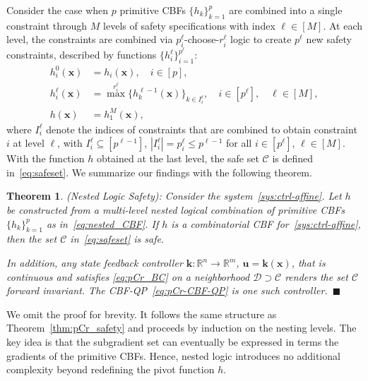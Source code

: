\documentclass[journal,twoside,web]{ieeecolor}
\newcommand{\real}{\mathbb{R}}
\newcommand{\until}[1]{[#1]}
\newcommand{\map}[3]{#1:#2 \rightarrow #3}
\newcommand{\longthmtitle}[1]{\mbox{}{\textit{(#1):}}}
\newcommand{\Cc}{\mathcal{C}}
\newcommand{\Dc}{\mathcal{D}}
\newtheorem{theorem}{Theorem}
\theoremstyle{definition}
\newcommand{\bk}{\mathbf{k}}
\newcommand{\bu}{\mathbf{u}}
\newcommand{\bx}{\mathbf{x}}
\begin{document}
Consider the case when $p$ primitive CBFs $\{h_k\}_{k=1}^p$ are combined into a single constraint through $M$ levels of safety specifications with index ${\ell \in \until{M}}$.
At each level, the constraints are combined via $p_i^\ell$-choose-$r_i^\ell$ logic to create $p^\ell$ new safety constraints, described by functions $\{h_i^\ell\}_{i=1}^{p^\ell}$:
\begin{equation}\label{eq:nested_CBF}
\begin{aligned}
    h_i^0(\bx) & = h_i(\bx),
    \quad i \in \until{p}, \\
    h_i^\ell(\bx) & =
    \max^{r_i^\ell} \{h_k^{\ell-1}(\bx)\}_{k \in I_i^\ell},
    \quad i \in \until{p^\ell}, \quad \ell \in \until{M}, \\
    h(\bx) & = h_1^M(\bx),
\end{aligned}
\end{equation}
where $I_i^\ell$ denote the indices of constraints that are combined to obtain constraint $i$ at level $\ell$, with ${I_i^\ell \subseteq \until{p^{\ell-1}}}$, ${|I_i^\ell| = p_i^\ell \leq p^{\ell-1}}$ for all ${i \in \until{p^\ell}}$, ${\ell \in \until{M}}$.
With the function $h$ obtained at the last level, the safe set $\Cc$ is defined in~\eqref{eq:safeset}. We summarize our findings with the following theorem. 

\begin{theorem}
    \longthmtitle{Nested Logic Safety}
    Consider the system~\eqref{sys:ctrl-affine}. Let $h$ be constructed from a multi-level nested logical combination of primitive CBFs $\{h_k\}_{k=1}^p$ as in~\eqref{eq:nested_CBF}. If $h$ is a combinatorial CBF for~\eqref{sys:ctrl-affine}, then the set $\Cc$ in~\eqref{eq:safeset} is safe.

    In addition, any state feedback controller ${\map{\bk}{\real^n}{\real^m}}$,  ${\bu=\bk(\bx)}$, that is continuous and satisfies
    \eqref{eq:pCr_BC} on a neighborhood $\Dc\supset \Cc$ renders the set $\Cc$ forward invariant. The CBF-QP~\eqref{eq:pCr-CBF-QP} is one such controller.~\hfill $\blacksquare$
    \label{thm:nested_logic}
\end{theorem}

We omit the proof for brevity. It follows the same structure as Theorem~\ref{thm:pCr_safety} and proceeds by induction on the nesting levels. The key idea is that the subgradient set can eventually be expressed in terms the gradients of the primitive CBFs. Hence, nested logic introduces no additional complexity beyond redefining the pivot function $h$.
\end{document}
